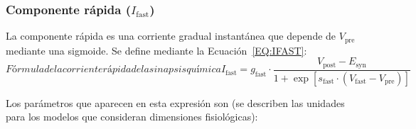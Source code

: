 \subsubsection{Componente rápida (\(I_{\mathrm{fast}}\))}

La componente rápida es una corriente gradual instantánea que depende de \(V_{\mathrm{pre}}\) mediante una sigmoide. Se define mediante la Ecuación~\ref{EQ:IFAST}:
\begin{equation}[EQ:IFAST]{Fórmula de la corriente rápida de la sinapsis química}
    \boxed{
        I_{\mathrm{fast}} =
        g_{\mathrm{fast}}
        \cdot
        \frac{V_{\mathrm{post}} - E_{\mathrm{syn}}}
        {1 + \exp[ s_{\mathrm{fast}} \cdot (V_{\mathrm{fast}} - V_{\mathrm{pre}}) ]}
    }
\end{equation}

\noindent Los parámetros que aparecen en esta expresión son (se describen las unidades para los modelos que consideran dimensiones fisiológicas):
